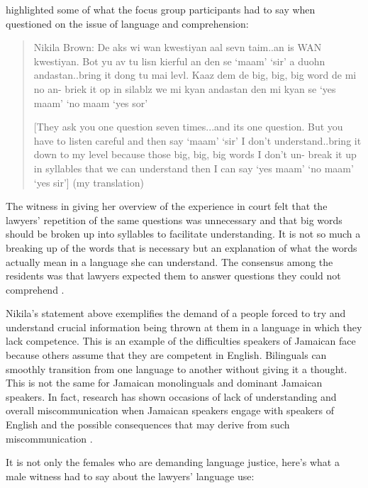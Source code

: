 \documentclass[output=paper,colorlinks,citecolor=brown]{langscibook}
\begin{document}
\citet{Walters2017} highlighted some of what the focus group participants had to say when questioned on the issue of language and comprehension:

\begin{quote}      
    Nikila Brown: De aks wi wan kwestiyan aal sevn taim..an is WAN kwestiyan. Bot yu av tu lisn kierful an den se ‘maam’ ‘sir’ a duohn andastan..bring it dong tu mai levl. Kaaz dem de big, big, big word de mi no an- briek it op in silablz we mi kyan andastan den mi kyan se ‘yes maam’ ‘no maam ‘yes sor’ 
    
    [They ask you one question seven times...and its one question. But you have to listen careful and then say ‘maam’ ‘sir’ I don’t understand..bring it down to my level because those big, big, big words I don’t un- break it up in syllables that we can understand then I can say ‘yes maam’ ‘no maam’ ‘yes sir’] (my translation)
\end{quote}

The witness in giving her overview of the experience in court felt that the lawyers’ repetition of the same questions was unnecessary and that big words should be broken up into syllables to facilitate understanding. It is not so much a breaking up of the words that is necessary but an explanation of what the words actually mean in a language she can understand. The consensus among the residents was that lawyers expected them to answer questions they could not comprehend \citep[33]{Walters2016}.

Nikila’s statement above exemplifies the demand of a people forced to try and understand crucial information being thrown at them in a language in which they lack competence. This is an example of the difficulties speakers of Jamaican face because others assume that they are competent in English. Bilinguals can smoothly transition from one language to another without giving it a thought. This is not the same for Jamaican monolinguals and dominant Jamaican speakers. In fact, research has shown occasions of lack of understanding and overall miscommunication when Jamaican speakers engage with speakers of English and the possible consequences that may derive from such miscommunication \citep{Brown-Blake2007}.

It is not only the females who are demanding language justice, here’s what a male witness had to say about the lawyers’ language use:
\end{document}
